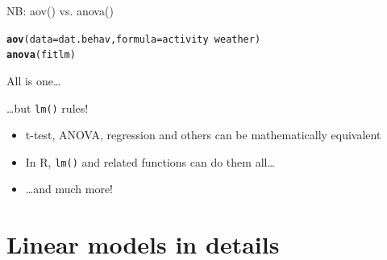 \documentclass[10pt]{beamer}\usepackage[]{graphicx}\usepackage[]{color}
\makeatletter
\newcommand{\hlopt}[1]{\textcolor[rgb]{0,0,0}{#1}}%
\newcommand{\hlstd}[1]{\textcolor[rgb]{0.345,0.345,0.345}{#1}}%
\newcommand{\hlkwc}[1]{\textcolor[rgb]{0.333,0.667,0.333}{#1}}%
\newcommand{\hlkwd}[1]{\textcolor[rgb]{0.737,0.353,0.396}{\textbf{#1}}}%
\newenvironment{kframe}{%
 \def\at@end@of@kframe{}%
 \ifinner\ifhmode%
  \def\at@end@of@kframe{\end{minipage}}%
  \begin{minipage}{\columnwidth}%
 \fi\fi%
 \def\FrameCommand##1{\hskip\@totalleftmargin \hskip-\fboxsep
 \colorbox{shadecolor}{##1}\hskip-\fboxsep
     \hskip-\linewidth \hskip-\@totalleftmargin \hskip\columnwidth}%
 \MakeFramed {\advance\hsize-\width
   \@totalleftmargin\z@ \linewidth\hsize
   \@setminipage}}%
 {\par\unskip\endMakeFramed%
 \at@end@of@kframe}
\newenvironment{knitrout}{}{} %
\makeatother
\begin{document}
\begin{frame}[fragile]{NB: aov() vs. anova()}

\begin{knitrout}
\color{fgcolor}\begin{kframe}
\begin{alltt}
\hlkwd{aov}\hlstd{(}\hlkwc{data} \hlstd{= dat.behav,} \hlkwc{formula} \hlstd{= activity} \hlopt{~} \hlstd{weather)}
\hlkwd{anova}\hlstd{(fitlm)}
\end{alltt}
\end{kframe}
\end{knitrout}

\end{frame}

\begin{frame}{All is one\dots}
\pause
  \begin{block}{\dots but \texttt{lm()} rules!}
    \begin{itemize}
      \item t-test, ANOVA, regression and others can be mathematically equivalent
      \item In R, \texttt{lm()} and related functions can do them all\dots
      \item \dots and much more!
    \end{itemize}
  \end{block}
\end{frame}

\section{Linear models in details}
\end{document}
